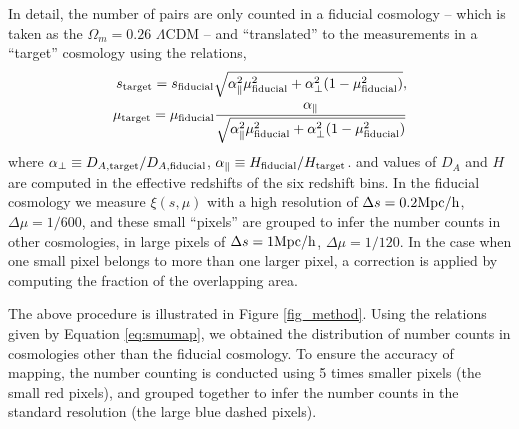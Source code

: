 \documentclass[iop]{emulateapj}
\begin{document}
In detail, the number of pairs are only counted in a fiducial cosmology
-- which is taken as the $\Omega_m=0.26$ $\Lambda$CDM --
and ``translated'' to the measurements in a ``target'' cosmology using the relations, 
\begin{eqnarray}\label{eq:smumap}
 s_{\rm target} = s_{\rm fiducial} \sqrt{\alpha_{\parallel}^2 \mu_{\rm fiducial}^2+\alpha_{\bot}^2(1-\mu_{\rm fiducial}^2)}, \\
 \mu_{\rm target} = \mu_{\rm fiducial} \frac{\alpha_\parallel}
 {\sqrt{\alpha_{\parallel}^2 \mu_{\rm fiducial}^2 +\alpha_{\bot}^2(1-\mu_{\rm fiducial}^2)}}
\end{eqnarray}
where $\alpha_{\bot}\equiv D_{A,\rm target}/D_{A,\rm fiducial}$,
$\alpha_{\parallel}\equiv H_{\rm fiducial}/H_{\rm target}$.
and values of $D_A$ and $H$ are computed in the effective redshifts of the six redshift bins.
In the fiducial cosmology
we measure $\xi(s,\mu)$ with a high resolution of
$\Delta s = 0.2 {\rm Mpc/h}$, $\Delta \mu = 1/600$,
and these small ``pixels'' are grouped to infer 
the number counts in other cosmologies, 
in large pixels of $\Delta s = 1 {\rm Mpc/h}$, $\Delta \mu = 1/120$.
In the case when one small pixel belongs to more than one larger pixel,
a correction is applied by computing the fraction of the overlapping area.

The above procedure is illustrated in Figure \ref{fig_method}.
Using the relations given by Equation \ref{eq:smumap},
we obtained the distribution of number counts in cosmologies other than the fiducial cosmology.
To ensure the accuracy of mapping, the number counting is conducted using 5 times smaller pixels (the small red pixels), 
and grouped together to infer the number counts in the standard resolution (the large blue dashed pixels).

\end{document}
